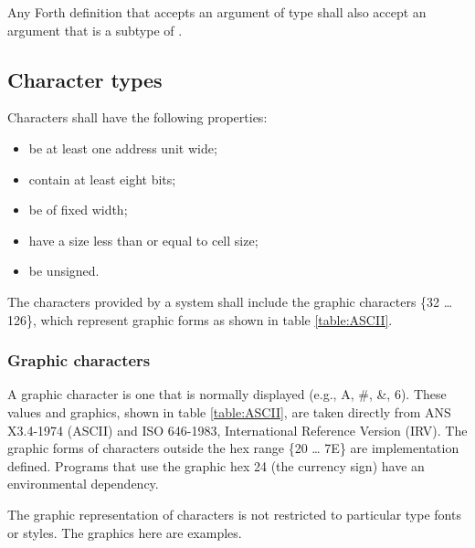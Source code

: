 Any Forth definition that accepts an argument of type 
shall also accept an argument that is a subtype of .


\subsection{Character types} %
\label{usage:char}

Characters shall have the following properties:
\begin{itemize}
\item be at least one address unit wide; \\[-4ex]
\item contain at least eight bits; \\[-4ex]
\item be of fixed width; \\[-4ex]
\item have a size less than or equal to cell size; \\[-4ex]
\item be unsigned.
\end{itemize}

The characters provided by a system shall include the graphic
characters \{32 {\ldots} 126\}, which represent graphic forms
as shown in table \ref{table:ASCII}.

\subsubsection{Graphic characters} %
\label{usage:ASCII}

A graphic character is one that is normally displayed (e.g.,
A, \#, \&, 6). These values and graphics, shown in table
\ref{table:ASCII}, are taken directly from ANS X3.4-1974 (ASCII)
and ISO 646-1983, International Reference Version (IRV). The
graphic forms of characters outside the hex range \{20 {\ldots}
7E\} are implementation defined. Programs that use the graphic hex
24 (the currency sign) have an environmental dependency.

The graphic representation of characters is not restricted to
particular type fonts or styles. The graphics here are examples.

